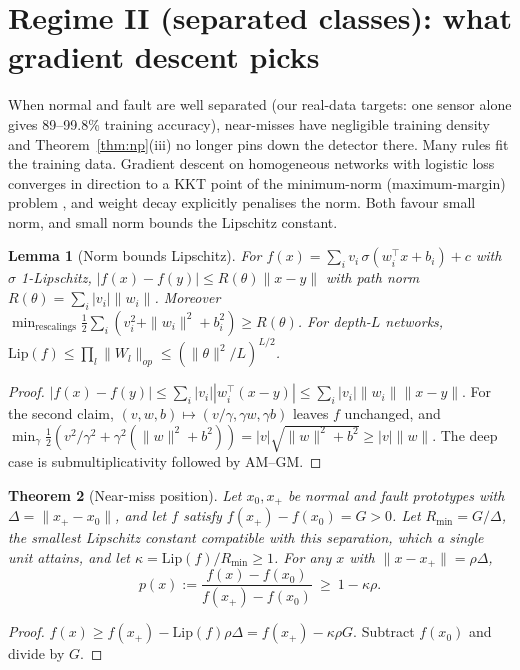 \documentclass[11pt]{article}
\newtheorem{theorem}{Theorem}[section]
\newtheorem{lemma}[theorem]{Lemma}
\theoremstyle{definition}
\theoremstyle{remark}
\newcommand{\1}{\mathbf{1}}
\newcommand{\Lip}{\mathrm{Lip}}
\begin{document}
\section{Regime II (separated classes): what gradient descent picks}\label{sec:separated}
When normal and fault are well separated (our real-data targets: one sensor alone gives 89--99.8\% training accuracy), near-misses have negligible training density and Theorem~\ref{thm:np}(iii) no longer pins down the detector there. Many rules fit the training data. Gradient descent on homogeneous networks with logistic loss converges in direction to a KKT point of the minimum-norm (maximum-margin) problem \citep{lyu2020,ji2020}, and weight decay explicitly penalises the norm. Both favour small norm, and small norm bounds the Lipschitz constant.

\begin{lemma}[Norm bounds Lipschitz]\label{lem:lip}
For $f(x)=\sum_iv_i\,\sigma(w_i^\top x+b_i)+c$ with $\sigma$ 1-Lipschitz, $|f(x)-f(y)|\le R(\theta)\|x-y\|$ with path norm $R(\theta)=\sum_i|v_i|\|w_i\|$. Moreover $\min_{\text{rescalings}}\tfrac12\sum_i(v_i^2+\|w_i\|^2+b_i^2)\ge R(\theta)$.
For depth-$L$ networks, $\Lip(f)\le\prod_l\|W_l\|_{op}\le(\|\theta\|^2/L)^{L/2}$.
\end{lemma}
\begin{proof}
$|f(x)-f(y)|\le\sum_i|v_i||w_i^\top(x-y)|\le\sum_i|v_i|\|w_i\|\|x-y\|$. For the second claim, $(v,w,b)\mapsto(v/\gamma,\gamma w,\gamma b)$ leaves $f$ unchanged, and $\min_\gamma\frac12(v^2/\gamma^2+\gamma^2(\|w\|^2+b^2))=|v|\sqrt{\|w\|^2+b^2}\ge|v|\|w\|$. The deep case is submultiplicativity followed by AM--GM.
\end{proof}

\begin{theorem}[Near-miss position]\label{thm:ratio}
Let $x_0,x_+$ be normal and fault prototypes with $\Delta=\|x_+-x_0\|$, and let $f$ satisfy $f(x_+)-f(x_0)=G>0$. Let $R_{\min}=G/\Delta$, the smallest Lipschitz constant compatible with this separation, which a single unit attains, and let $\kappa=\Lip(f)/R_{\min}\ge1$. For any $x$ with $\|x-x_+\|=\rho\Delta$,
\[
p(x):=\frac{f(x)-f(x_0)}{f(x_+)-f(x_0)}\ \ge\ 1-\kappa\rho .
\]
\end{theorem}
\begin{proof}
$f(x)\ge f(x_+)-\Lip(f)\rho\Delta=f(x_+)-\kappa\rho G$. Subtract $f(x_0)$ and divide by $G$.
\end{proof}
\end{document}
